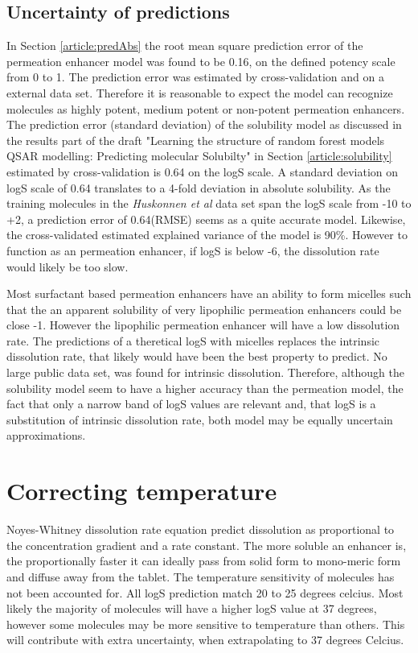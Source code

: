 \subsection{Uncertainty of predictions}
In Section \ref{article:predAbs} the root mean square prediction error of the permeation enhancer model was found to be 0.16, on the defined potency scale from 0 to 1. The prediction error was estimated by cross-validation and on a external data set. Therefore it is reasonable to expect the model can recognize molecules as highly potent, medium potent or non-potent permeation enhancers. The prediction error (standard deviation) of the solubility model as discussed in the results part of the draft "Learning the structure of random forest models QSAR modelling: Predicting molecular Solubilty" in Section \ref{article:solubility} estimated by cross-validation is 0.64 on the logS scale. A standard deviation on logS scale of 0.64 translates to a 4-fold deviation in absolute solubility. As the training molecules in the \textit{Huskonnen et al} data set \cite{palmer2007random} span the logS scale from -10 to +2, a prediction error of 0.64(RMSE) seems as a quite accurate model. Likewise, the cross-validated estimated explained variance of the model is 90\%. However to function as an permeation enhancer, if logS is below -6, the dissolution rate would likely be too slow.

Most surfactant based permeation enhancers have an ability to form micelles such that the an apparent solubility of very lipophilic permeation enhancers could be close -1. However the lipophilic permeation enhancer will have a low dissolution rate. The predictions of a theretical logS with micelles replaces the intrinsic dissolution rate, that likely would have been the best property to predict. No large public data set, was found for intrinsic dissolution. Therefore, although the solubility model seem to have a higher accuracy than the permeation model, the fact that only a narrow band of logS values are relevant and, that logS is a substitution of intrinsic dissolution rate, both model may be equally uncertain approximations.

\section{Correcting temperature}
Noyes-Whitney dissolution rate equation predict dissolution as proportional to the concentration gradient and a rate constant. The more soluble an enhancer is, the proportionally faster it can ideally pass from solid form to mono-meric form and diffuse away from the tablet. The temperature sensitivity of molecules has not been accounted for. All logS prediction match 20 to 25 degrees celcius. Most likely the majority of molecules will have a higher logS value at 37 degrees, however some molecules may be more sensitive to temperature than others. This will contribute with extra uncertainty, when extrapolating to 37 degrees Celcius.

